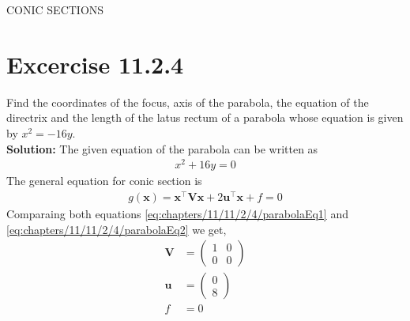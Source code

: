 \documentclass[12pt]{article}
\providecommand{\brak}[1]{\ensuremath{\left(#1\right)}}
\newcommand{\solution}{\noindent \textbf{Solution: }}
\newcommand{\myvec}[1]{\ensuremath{\begin{pmatrix}#1\end{pmatrix}}}
\let\vec\mathbf
\begin{document}
\begin{center}
\textbf\large{CONIC SECTIONS}

\end{center}
\section*{Excercise 11.2.4}
	Find the coordinates of the focus, axis of the parabola, the equation of the directrix and the length of the latus rectum of a parabola whose equation is given by $x^2=-16y$.\\

\solution
\fi
The given equation of the parabola can be written as
\begin{align}
	\label{eq:chapters/11/11/2/4/parabolaEq1}
	x^2+16y=0
\end{align}
The general equation for conic section is
\begin{align}
	\label{eq:chapters/11/11/2/4/parabolaEq2}
	g\brak{\vec{x}}=\vec{x}^\top \vec{V}\vec{x}+2\vec{u}^\top \vec{x}+f=0
\end{align}
Comparaing both equations \eqref{eq:chapters/11/11/2/4/parabolaEq1} and \eqref{eq:chapters/11/11/2/4/parabolaEq2} we get,
\begin{align}
	\label{eq:chapters/11/11/2/4/eqV}
	\vec{V} &= \myvec{1&0\\0&0}\\
	\label{eq:chapters/11/11/2/4/eqU}
	\vec{u} &= \myvec{0\\8}\\
	\label{eq:chapters/11/11/2/4/eqF}
	f &= 0
\end{align}
\end{document}
